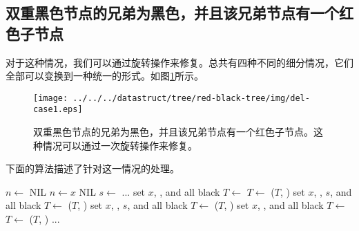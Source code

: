 \documentclass{ctexart}
\begin{document}
\subsection{双重黑色节点的兄弟为黑色，并且该兄弟节点有一个红色子节点}
对于这种情况，我们可以通过旋转操作来修复。总共有四种不同的细分情况，它们全部可以变换到一种统一的形式。如图\ref{fig:del-case1}所示。

\begin{figure}[htbp]
   \centering
   \texttt{[image: ../../../datastruct/tree/red-black-tree/img/del-case1.eps]}
   \caption{双重黑色节点的兄弟为黑色，并且该兄弟节点有一个红色子节点。这种情况可以通过一次旋转操作来修复。}
   \label{fig:del-case1}
\end{figure}

下面的算法描述了针对这一情况的处理。

\begin{algorithmic}[1]
  \State $n \gets$ NIL
    
    \State $n \gets x$
  \EndIf
   
    \State \Return NIL
  \EndIf
     
        \State $s \gets$ 
        \State ...
            \State set $x$, , and  all black
            \State $T \gets$ 
            \State $T \gets$ ($T$, )
          \Else {}
            \State set $x$, , $s$, and  all black
            \State $T \gets$ ($T$, )
          \EndIf
           
            \State set $x$, , $s$, and  all black
            \State $T \gets$ ($T$, )
          \Else {}
            \State set $x$, , and  all black
            \State $T \gets$ 
            \State $T \gets$ ($T$, )
          \EndIf
        \State ...
        \EndIf
    \EndIf
  \EndWhile
\EndFunction
\end{algorithmic}
\end{document}
